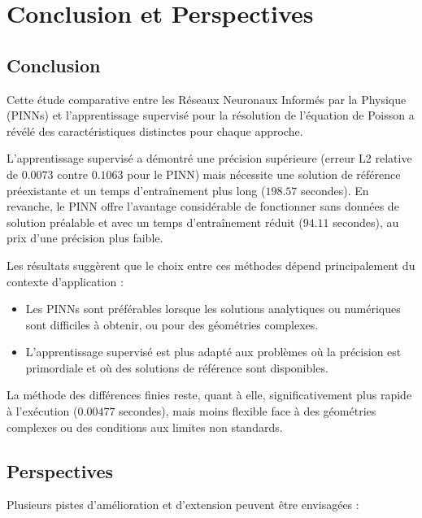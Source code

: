 \documentclass[11pt,a4paper]{article}
\begin{document}
\section{Conclusion et Perspectives}

\subsection{Conclusion}

Cette étude comparative entre les Réseaux Neuronaux Informés par la Physique (PINNs) et l'apprentissage supervisé pour la résolution de l'équation de Poisson a révélé des caractéristiques distinctes pour chaque approche.
\vspace{1em}

L'apprentissage supervisé a démontré une précision supérieure (erreur L2 relative de $0.0073$ contre $0.1063$ pour le PINN) mais nécessite une solution de référence préexistante et un temps d'entraînement plus long ($198.57$ secondes). En revanche, le PINN offre l'avantage considérable de fonctionner sans données de solution préalable et avec un temps d'entraînement réduit ($94.11$ secondes), au prix d'une précision plus faible.
\vspace{1em}

Les résultats suggèrent que le choix entre ces méthodes dépend principalement du contexte d'application :
\begin{itemize}
    \item Les PINNs sont préférables lorsque les solutions analytiques ou numériques sont difficiles à obtenir, ou pour des géométries complexes.
    \item L'apprentissage supervisé est plus adapté aux problèmes où la précision est primordiale et où des solutions de référence sont disponibles.
\end{itemize}

La méthode des différences finies reste, quant à elle, significativement plus rapide à l'exécution ($0.00477$ secondes), mais moins flexible face à des géométries complexes ou des conditions aux limites non standards.

\subsection{Perspectives}

Plusieurs pistes d'amélioration et d'extension peuvent être envisagées :
\end{document}
